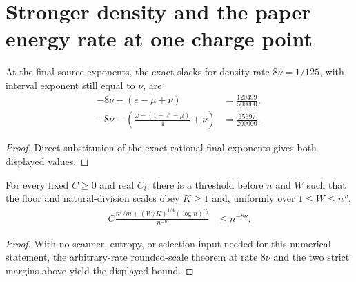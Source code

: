 \section{Stronger density and the paper energy rate at one charge point}
\label{sec:arealaw-source-selected-energy}

\begin{lemma}
    \label{thm:arealaw-eight-nu-density-margins}
    \leanok
    At the final source exponents, the exact slacks for density rate
    $8\nu=1/125$, with interval exponent still equal to $\nu$, are
    \begin{align}
        -8\nu-(e-\mu+\nu) & =\frac{120499}{500000},\nonumber \\
        -8\nu-\left(\frac{\omega-(1-\ell-\mu)}4+\nu\right)
                          & =\frac{35697}{200000}.
    \end{align}
\end{lemma}
\begin{proof}
    \leanok
    Direct substitution of the exact rational final exponents gives both
    displayed values.
\end{proof}

\begin{lemma}
    \label{thm:arealaw-principal-density-eight-nu}
    \leanok
    For every fixed $C\geq0$ and real $C_l$, there is a threshold before
    $n$ and $W$ such that the floor and natural-division scales
    obey $K\geq1$ and, uniformly over $1\leq W\leq n^\omega$,
    \begin{align}
        C\frac{n^e/m+(W/K)^{1/4}(\log n)^{C_l}}{n^{-\nu}}
         & \leq n^{-8\nu}.
    \end{align}
\end{lemma}
\begin{proof}
    \leanok
    With no scanner, entropy, or selection input needed for this numerical
    statement, the arbitrary-rate rounded-scale theorem at rate $8\nu$ and
    the two strict margins above yield the displayed bound.
\end{proof}


